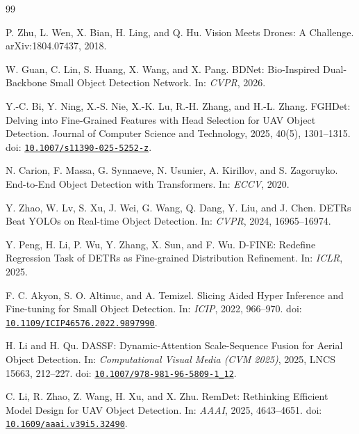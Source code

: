\begin{thebibliography}{99}

\fontsize{9}{11}\selectfont


 P. Zhu, L. Wen, X. Bian, H. Ling, and Q. Hu. Vision Meets Drones: A Challenge. arXiv:1804.07437, 2018.

 W. Guan, C. Lin, S. Huang, X. Wang, and X. Pang. BDNet: Bio-Inspired Dual-Backbone Small Object Detection Network. In: \emph{CVPR}, 2026.

 Y.-C. Bi, Y. Ning, X.-S. Nie, X.-K. Lu, R.-H. Zhang, and H.-L. Zhang. FGHDet: Delving into Fine-Grained Features with Head Selection for UAV Object Detection. Journal of Computer Science and Technology, 2025, 40(5), 1301--1315. doi: \href{https://doi.org/10.1007/s11390-025-5252-z}{\nolinkurl{10.1007/s11390-025-5252-z}}.

 N. Carion, F. Massa, G. Synnaeve, N. Usunier, A. Kirillov, and S. Zagoruyko. End-to-End Object Detection with Transformers. In: \emph{ECCV}, 2020.

 Y. Zhao, W. Lv, S. Xu, J. Wei, G. Wang, Q. Dang, Y. Liu, and J. Chen. DETRs Beat YOLOs on Real-time Object Detection. In: \emph{CVPR}, 2024, 16965--16974.

 Y. Peng, H. Li, P. Wu, Y. Zhang, X. Sun, and F. Wu. D-FINE: Redefine Regression Task of DETRs as Fine-grained Distribution Refinement. In: \emph{ICLR}, 2025.

 F. C. Akyon, S. O. Altinuc, and A. Temizel. Slicing Aided Hyper Inference and Fine-tuning for Small Object Detection. In: \emph{ICIP}, 2022, 966--970. doi: \href{https://doi.org/10.1109/ICIP46576.2022.9897990}{\nolinkurl{10.1109/ICIP46576.2022.9897990}}.

 H. Li and H. Qu. DASSF: Dynamic-Attention Scale-Sequence Fusion for Aerial Object Detection. In: \emph{Computational Visual Media (CVM 2025)}, 2025, LNCS 15663, 212--227. doi: \href{https://doi.org/10.1007/978-981-96-5809-1_12}{\nolinkurl{10.1007/978-981-96-5809-1_12}}.

 C. Li, R. Zhao, Z. Wang, H. Xu, and X. Zhu. RemDet: Rethinking Efficient Model Design for UAV Object Detection. In: \emph{AAAI}, 2025, 4643--4651. doi: \href{https://doi.org/10.1609/aaai.v39i5.32490}{\nolinkurl{10.1609/aaai.v39i5.32490}}.


\end{thebibliography}
